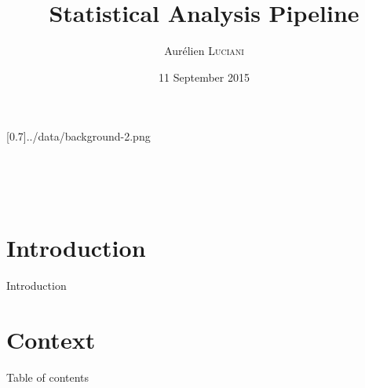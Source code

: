 \documentclass[10pt,aspectratio=43]{beamer}
\title{Statistical Analysis Pipeline}
\author{Aurélien \textsc{Luciani}}
\institute{Université de Bordeaux}
\date{11 September 2015}
\begin{document}
\masseyBrand{}[0.7]{../data/background-2.png}{}{}



\begin{frame}[t, noframenumbering]  %
\masseyTitlepage %

\raggedleft
\begin{mblock}[140pt]{0.7}{}
\raggedleft
\textbf{\insertauthor}\\
\insertdepartment\\
\insertinstitute\\
\insertdate
\end{mblock}
\vfill
\end{frame}


\section*{Introduction}
\masseyBrand{}{}{}{}
\begin{frame}{}{Introduction}
\end{frame}

\section{Context}
\begin{frame}{}{Table of contents}
\tableofcontents[currentsection, subsubsectionstyle=hide]
\end{frame}
\end{document}
